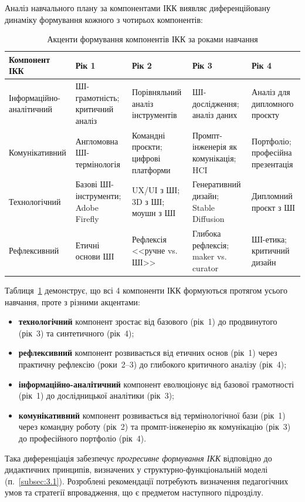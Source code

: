 Аналіз навчального плану за компонентами ІКК виявляє диференційовану динаміку формування кожного з чотирьох компонентів:

\begin{table}[htbp]
\centering
\caption{Акценти формування компонентів ІКК за роками навчання}\label{tab:ikk-by-year}
\small
\begin{tabularx}{\textwidth}{@{}Xp{}p{}p{}p{}@{}}
\toprule
\textbf{Компонент ІКК} & \textbf{Рік 1} & \textbf{Рік 2} & \textbf{Рік 3} & \textbf{Рік 4} \\
\midrule
Інформаційно-аналітичний & ШІ-грамотність; критичний аналіз & Порівняльний аналіз інструментів & ШІ-дослідження; аналіз даних & Аналіз для дипломного проєкту \\
\addlinespace
Комунікативний & Англомовна ШІ-термінологія & Командні проєкти; цифрові платформи & Промпт-інженерія як комунікація; HCI & Портфоліо; професійна презентація \\
\addlinespace
Технологічний & Базові ШІ-інструменти; Adobe Firefly & UX/UI з ШІ; 3D з ШІ; моушн з ШІ & Генеративний дизайн; Stable Diffusion & Дипломний проєкт з ШІ \\
\addlinespace
Рефлексивний & Етичні основи ШІ & Рефлексія <<ручне vs. ШІ>> & Глибока рефлексія; maker vs. curator & ШІ-етика; критичний дизайн \\
\bottomrule
\end{tabularx}
\end{table}

Таблиця~\ref{tab:ikk-by-year} демонструє, що всі 4 компоненти ІКК формуються протягом усього навчання, проте з різними акцентами:
\begin{itemize}
    \item \textbf{технологічний} компонент зростає від базового (рік~1) до продвинутого (рік~3) та синтетичного (рік~4);
    \item \textbf{рефлексивний} компонент розвивається від етичних основ (рік~1) через практичну рефлексію (роки~2--3) до глибокого критичного аналізу (рік~4);
    \item \textbf{інформаційно-аналітичний} компонент еволюціонує від базової грамотності (рік~1) до дослідницької аналітики (рік~3);
    \item \textbf{комунікативний} компонент розвивається від термінологічної бази (рік~1) через командну роботу (рік~2) та промпт-інженерію як комунікацію (рік~3) до професійного портфоліо (рік~4).
\end{itemize}

Така диференціація забезпечує \textit{прогресивне формування ІКК} відповідно до дидактичних принципів, визначених у структурно-функціональній моделі (п.~\ref{subsec:3.1}). Розроблені рекомендації потребують визначення педагогічних умов та стратегії впровадження, що є предметом наступного підрозділу.
